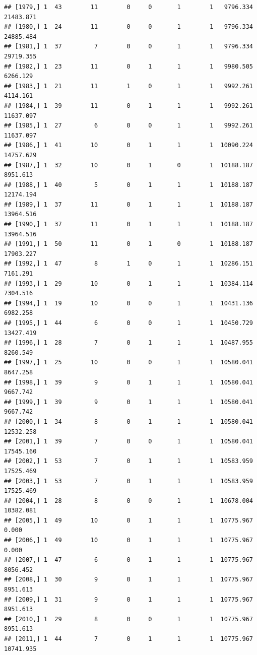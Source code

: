 \documentclass[
]{article}
\begin{document}
\begin{verbatim}
## [1979,] 1  43        11        0     0       1        1   9796.334  21483.871
## [1980,] 1  24        11        0     0       1        1   9796.334  24885.484
## [1981,] 1  37         7        0     0       1        1   9796.334  29719.355
## [1982,] 1  23        11        0     1       1        1   9980.505   6266.129
## [1983,] 1  21        11        1     0       1        1   9992.261   4114.161
## [1984,] 1  39        11        0     1       1        1   9992.261  11637.097
## [1985,] 1  27         6        0     0       1        1   9992.261  11637.097
## [1986,] 1  41        10        0     1       1        1  10090.224  14757.629
## [1987,] 1  32        10        0     1       0        1  10188.187   8951.613
## [1988,] 1  40         5        0     1       1        1  10188.187  12174.194
## [1989,] 1  37        11        0     1       1        1  10188.187  13964.516
## [1990,] 1  37        11        0     1       1        1  10188.187  13964.516
## [1991,] 1  50        11        0     1       0        1  10188.187  17903.227
## [1992,] 1  47         8        1     0       1        1  10286.151   7161.291
## [1993,] 1  29        10        0     1       1        1  10384.114   7304.516
## [1994,] 1  19        10        0     0       1        1  10431.136   6982.258
## [1995,] 1  44         6        0     0       1        1  10450.729  13427.419
## [1996,] 1  28         7        0     1       1        1  10487.955   8260.549
## [1997,] 1  25        10        0     0       1        1  10580.041   8647.258
## [1998,] 1  39         9        0     1       1        1  10580.041   9667.742
## [1999,] 1  39         9        0     1       1        1  10580.041   9667.742
## [2000,] 1  34         8        0     1       1        1  10580.041  12532.258
## [2001,] 1  39         7        0     0       1        1  10580.041  17545.160
## [2002,] 1  53         7        0     1       1        1  10583.959  17525.469
## [2003,] 1  53         7        0     1       1        1  10583.959  17525.469
## [2004,] 1  28         8        0     0       1        1  10678.004  10382.081
## [2005,] 1  49        10        0     1       1        1  10775.967      0.000
## [2006,] 1  49        10        0     1       1        1  10775.967      0.000
## [2007,] 1  47         6        0     1       1        1  10775.967   8056.452
## [2008,] 1  30         9        0     1       1        1  10775.967   8951.613
## [2009,] 1  31         9        0     1       1        1  10775.967   8951.613
## [2010,] 1  29         8        0     0       1        1  10775.967   8951.613
## [2011,] 1  44         7        0     1       1        1  10775.967  10741.935

\end{verbatim}
\end{document}
